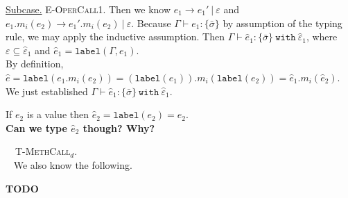 \documentclass{llncs}
\newcommand{\keywadj}[1]{\mathtt{#1}}
\newcommand{\keyw}[1]{\keywadj{#1}~}
\newcommand{\proofcase}[2]{
	\begin{adjustwidth}{1.5em}{0pt}
		\fbox{Case.}~~#1. \\ ~#2
	\end{adjustwidth}
}
\newcommand{\subcase}[1] {
	\begin{adjustwidth}{2.2em}{0pt}
		\underline{Subcase.} #1
	\end{adjustwidth}
}
\newcommand{\type}[2]{
	#1~\keyw{with} #2
}
\begin{document}
{{	\subcase{\textsc{E-OperCall1}.
	Then we know $e_1 \longrightarrow e_1'~|~\varepsilon$ and $e_1.m_i(e_2) \longrightarrow e_1'.m_i(e_2)~|~\varepsilon$. Because $\Gamma \vdash e_1 : \{ \bar \sigma \}$ by assumption of the typing rule, we may apply the inductive assumption. Then $\Gamma \vdash \hat e_1 : \type{ \{ \bar \sigma \} }{\hat \varepsilon_1}$, where $\varepsilon \subseteq \hat \varepsilon_1$ and $\hat e_1 = \keywadj{label}(\Gamma, e_1)$.\\
	
\noindent
By definition, $\hat e = \keywadj{label}(e_1.m_i(e_2)) = (\keywadj{label}(e_1)).m_i(\keywadj{label}(e_2)) = \hat e_1.m_i(\hat e_2)$. We just established $\Gamma \vdash \hat e_1 : \type{ \{ \bar \sigma \} }{\hat \varepsilon_1}$.

\noindent
If $e_2$ is a value then $\hat e_2 = \keywadj{label}(e_2) = e_2$. \\

\noindent
 \textbf{Can we type $\hat e_2$ though? Why?\\}
	
	}
}

\proofcase{\textsc{T-MethCall$_d$}}{
We also know the following.


\textbf{TODO}
}
}
\end{document}
